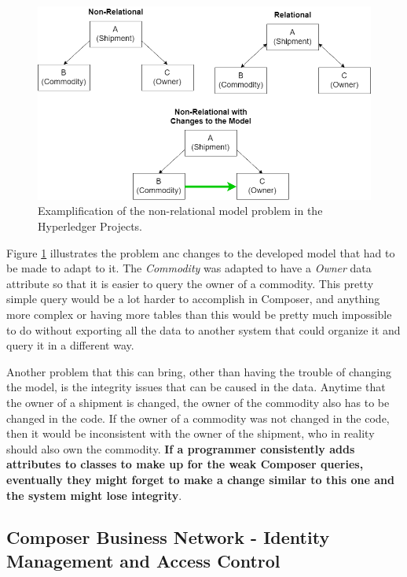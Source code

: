 \begin{figure}[h]
    \centering
    \includegraphics[scale=0.40]{media/relational_problem.png}
    \caption[Examplification of the non-relational model problem in the Hyperledger Projects.]{Examplification of the non-relational model problem in the Hyperledger Projects.}
    \label{fig:relational_problem}
\end{figure}
Figure \ref{fig:relational_problem} illustrates the problem anc changes to the developed model that had to be made to adapt to it. The \textit{Commodity} was adapted to have a \textit{Owner} data attribute so that it is easier to query the owner of a commodity. This pretty simple query would be a lot harder to accomplish in Composer, and anything more complex or having more tables than this would be pretty much impossible to do without exporting all the data to another system that could organize it and query it in a different way. 

Another problem that this can bring, other than having the trouble of changing the model, is the integrity issues that can be caused in the data. Anytime that the owner of a shipment is changed, the owner of the commodity also has to be changed in the code. If the owner of a commodity was not changed in the code, then it would be inconsistent with the owner of the shipment, who in reality should also own the commodity. \textbf{If a programmer consistently adds attributes to classes to make up for the weak Composer queries, eventually they might forget to make a change similar to this one and the system might lose integrity}.


\subsection{Composer Business Network - Identity Management and Access Control}


